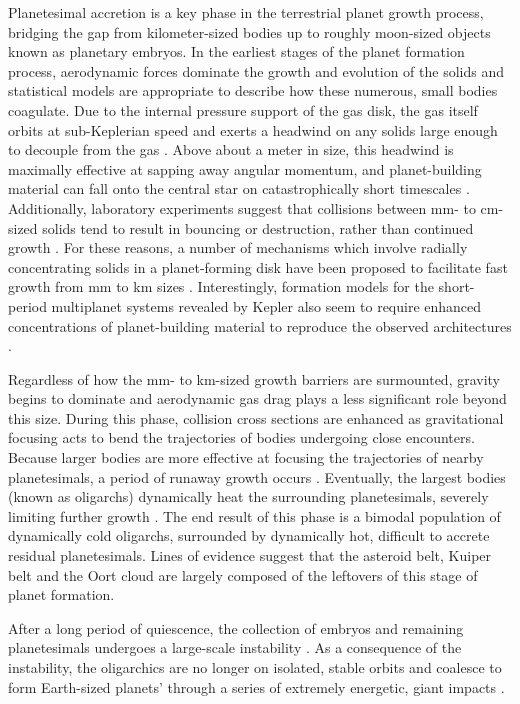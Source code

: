 \documentclass[twocolumn]{aastex63}
\begin{document}
Planetesimal accretion is a key phase in the terrestrial planet growth
process, bridging the gap from kilometer-sized bodies up to roughly
moon-sized objects known as planetary embryos. In the earliest stages
of the planet formation process, aerodynamic forces dominate the
growth and evolution of the solids and statistical models
\citep{johansen14, birnstiel16} are appropriate to describe how these
numerous, small bodies coagulate. Due to the internal pressure support
of the gas disk, the gas itself orbits at sub-Keplerian speed and
exerts a headwind on any solids large enough to decouple from the gas
\citep{weidenschilling77}. Above about a meter in size, this headwind
is maximally effective at sapping away angular momentum, and planet-building material can fall onto the central star on catastrophically short timescales \citep{weidenschilling77, nakagawa86}. Additionally, laboratory experiments suggest that collisions between mm- to cm- sized solids tend to result in bouncing or destruction, rather than continued growth \citep{blum93, beitz11, colwell03}. For these reasons, a number of mechanisms which involve radially concentrating solids in a planet-forming disk have been proposed to facilitate fast growth from mm to km sizes \citep{johansen07, lyra08, bai10}. Interestingly, formation models for the short-period multiplanet systems revealed by Kepler \citep{fabrycky14} also seem to require enhanced concentrations of planet-building material to reproduce the observed architectures \citep{raymond07, hansen12}.

Regardless of how the mm- to km-sized growth barriers are surmounted, gravity begins to dominate and aerodynamic gas drag plays a less significant role beyond this size. During this phase, collision cross sections are enhanced as gravitational focusing \citep{safronov69} acts to bend the trajectories of bodies undergoing close encounters. Because larger bodies are more effective at focusing the trajectories of nearby planetesimals, a period of runaway growth occurs \citep{wetherill89, kokubo96, barnes09}. Eventually, the largest bodies (known as oligarchs) dynamically heat the surrounding planetesimals, severely limiting further growth \citep{kokubo98}. The end result of this phase is a bimodal population of dynamically cold oligarchs, surrounded by dynamically hot, difficult to accrete residual planetesimals. Lines of evidence suggest that the asteroid belt, Kuiper belt and the Oort cloud are largely composed of the leftovers of this stage of planet formation.

After a long period of quiescence, the collection of embryos and
remaining planetesimals undergoes a large-scale instability
\citep{chambers98}.
As a consequence of the instability, the oligarchics are no longer
on isolated, stable orbits and coalesce to form Earth-sized planets'
through a series of extremely energetic, giant 
impacts \citep{kokubo02, raymond05, raymond06}.
\end{document}
